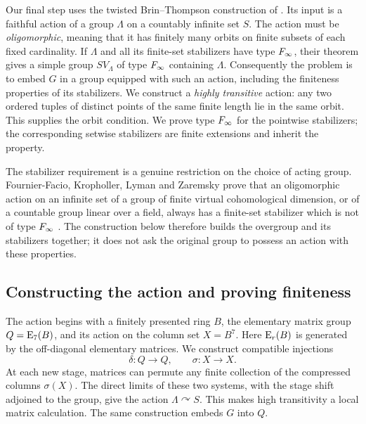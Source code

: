 Our final step uses the twisted Brin--Thompson construction of
\citet{BelkZaremsky2022}. Its input is a faithful action of a group
\(\Lambda\) on a countably infinite set \(S\). The action must be
\emph{oligomorphic}, meaning that it has finitely many orbits on finite
subsets of each fixed cardinality. If \(\Lambda\) and all its finite-set
stabilizers have type \(F_\infty\), their theorem gives a simple group
\(SV_\Lambda\) of type \(F_\infty\) containing \(\Lambda\).
Consequently the problem is to embed \(G\) in a group equipped with
such an action, including the finiteness properties of its stabilizers.
We construct a \emph{highly transitive} action: any two ordered tuples
of distinct points of the same finite length lie in the same orbit.
This supplies the orbit condition. We prove type \(F_\infty\) for the
pointwise stabilizers; the corresponding setwise stabilizers are
finite extensions and inherit the property.

The stabilizer requirement is a genuine restriction on the choice of
acting group. Fournier-Facio, Kropholler, Lyman and Zaremsky prove that
an oligomorphic action on an infinite set of a group of finite virtual
cohomological dimension, or of a countable group linear over a field,
always has a finite-set stabilizer which is not of type \(F_\infty\)
\citep[Theorem~1.1]{FFKLZstabilizers}.
The construction below therefore builds the overgroup and its
stabilizers together; it does not ask the original group to possess
an action with these properties.

\subsection{Constructing the action and proving finiteness}

The action begins with a finitely presented ring \(B\), the elementary
matrix group \(Q=\mathrm E_7(B)\), and its action on the column set \(X=B^7\).
Here \(\mathrm E_r(B)\) is generated by the off-diagonal elementary matrices.
We construct compatible injections
\[
 \delta:Q\longrightarrow Q,\qquad \sigma:X\longrightarrow X.
\]
At each new stage, matrices can permute any finite collection of the
compressed columns \(\sigma(X)\). The direct limits of these two
systems, with the stage shift adjoined to the group, give the action
\(\Lambda\curvearrowright S\). This makes high transitivity a local
matrix calculation. The same construction embeds \(G\) into \(Q\).

